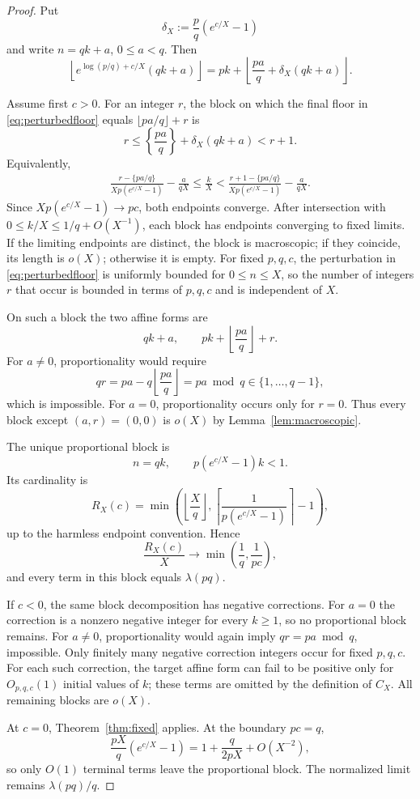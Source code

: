 \documentclass[preprint,12pt]{elsarticle}
\numberwithin{equation}{section}
\theoremstyle{plain}
\theoremstyle{definition}
\theoremstyle{remark}
\begin{document}
\begin{proof}
Put
\[
\delta_X:=\frac pq(e^{c/X}-1)
\]
and write $n=qk+a$, $0\le a<q$. Then
\begin{equation}
\left\lfloor e^{\log(p/q)+c/X}(qk+a)\right\rfloor
=
pk+
\left\lfloor\frac{pa}{q}+\delta_X(qk+a)\right\rfloor.
\label{eq:perturbedfloor}
\end{equation}

Assume first $c>0$. For an integer $r$, the block on which the final floor in
\eqref{eq:perturbedfloor} equals $\lfloor pa/q\rfloor+r$ is
\[
r\le
\left\{\frac{pa}{q}\right\}+\delta_X(qk+a)<r+1.
\]
Equivalently,
\begin{align}
\frac{r-\{pa/q\}}{Xp(e^{c/X}-1)}
-\frac{a}{qX}
\le \frac{k}{X}
<
\frac{r+1-\{pa/q\}}{Xp(e^{c/X}-1)}
-\frac{a}{qX}.
\label{eq:blockinterval}
\end{align}
Since $Xp(e^{c/X}-1)\to pc$, both endpoints converge. After intersection
with $0\le k/X\le1/q+O(X^{-1})$, each block has endpoints converging to
fixed limits. If the limiting endpoints are distinct, the block is
macroscopic; if they coincide, its length is $o(X)$; otherwise it is empty.
For fixed $p,q,c$, the perturbation in \eqref{eq:perturbedfloor} is uniformly
bounded for $0\le n\le X$, so the number of integers $r$ that occur is
bounded in terms of $p,q,c$ and is independent of $X$.

On such a block the two affine forms are
\[
qk+a,\qquad
pk+\left\lfloor\frac{pa}{q}\right\rfloor+r.
\]
For $a\ne0$, proportionality would require
\[
qr=pa-q\left\lfloor\frac{pa}{q}\right\rfloor
=pa\bmod q\in\{1,\ldots,q-1\},
\]
which is impossible. For $a=0$, proportionality occurs only for $r=0$.
Thus every block except $(a,r)=(0,0)$ is $o(X)$ by
Lemma~\ref{lem:macroscopic}.

The unique proportional block is
\[
n=qk,\qquad p(e^{c/X}-1)k<1.
\]
Its cardinality is
\[
R_X(c)=
\min\!\left(
\left\lfloor\frac Xq\right\rfloor,
\left\lceil\frac1{p(e^{c/X}-1)}\right\rceil-1
\right),
\]
up to the harmless endpoint convention. Hence
\[
\frac{R_X(c)}X\longrightarrow
\min\!\left(\frac1q,\frac1{pc}\right),
\]
and every term in this block equals $\lambda(pq)$.

If $c<0$, the same block decomposition has negative corrections. For
$a=0$ the correction is a nonzero negative integer for every $k\ge1$, so no
proportional block remains. For $a\ne0$, proportionality would again imply
$qr=pa\bmod q$, impossible. Only finitely many negative correction integers occur for fixed $p,q,c$.
For each such correction, the target affine form can fail to be positive only
for $O_{p,q,c}(1)$ initial values of $k$; these terms are omitted by the
definition of $C_X$. All remaining blocks are $o(X)$.

At $c=0$, Theorem~\ref{thm:fixed} applies. At the boundary $pc=q$,
\[
\frac{pX}{q}(e^{c/X}-1)
=
1+\frac{q}{2pX}+O(X^{-2}),
\]
so only $O(1)$ terminal terms leave the proportional block. The normalized
limit remains $\lambda(pq)/q$.
\end{proof}
\end{document}
